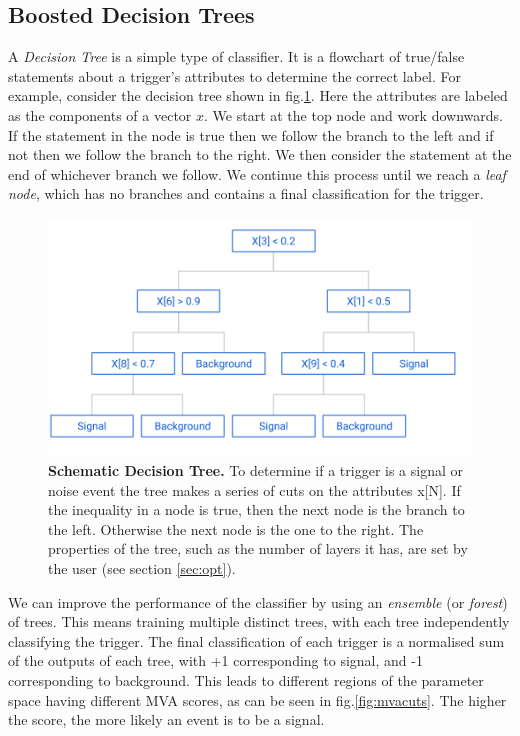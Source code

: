 \documentclass[11pt]{cuthesis}
\begin{document}
\subsection{Boosted Decision Trees} \label{bdt}
A \textit{Decision Tree} is a simple type of classifier. It is a flowchart of true/false statements about a trigger's attributes to determine the correct label. For example, consider the decision tree shown in fig.\ref{fig:tree}. Here the attributes are labeled as the components of a vector $x$. We start at the top node and work downwards. If the statement in the node is true then we follow the branch to the left and if not then we follow the branch to the right. We then consider the statement at the end of whichever branch we follow. We continue this process until we reach a \textit{leaf node}, which has no branches and contains a final classification for the trigger.  
\begin{figure} %
\begin{center}
\includegraphics[width=0.8\linewidth]{decision_tree.png}
\end{center}
\caption{\textbf{Schematic Decision Tree.} To determine if a trigger is a signal or noise event the tree makes a series of cuts on the attributes x[N]. If the inequality in a node is true, then the next node is the branch to the left. Otherwise the next node is the one to the right. The properties of the tree, such as the number of layers it has, are set by the user (see section \ref{sec:opt}). }
\label{fig:tree}
\end{figure}

We can improve the performance of the classifier by using an \textit{ensemble} (or \textit{forest}) of trees. This means training multiple distinct trees, with each tree independently classifying the trigger. The final classification of each trigger is a normalised sum of the outputs of each tree, with +1 corresponding to signal, and -1 corresponding to background. This leads to different regions of the parameter space having different MVA scores, as can be seen in fig.\ref{fig:mvacuts}. The higher the score, the more likely an event is to be a signal. 
\end{document}
